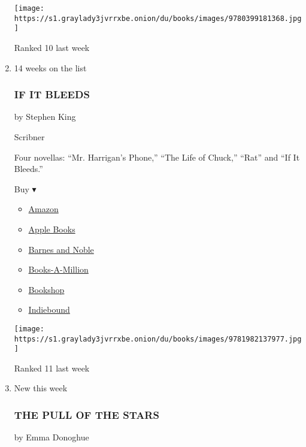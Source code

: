 \begin{enumerate}
  \texttt{[image: https://s1.graylady3jvrrxbe.onion/du/books/images/9780399181368.jpg]}

  Ranked 10 last week
\item
  14 weeks on the list

  \hypertarget{if-it-bleeds}{%
  \subsubsection{IF IT BLEEDS}\label{if-it-bleeds}}

  by Stephen King

  Scribner

  Four novellas: ``Mr. Harrigan's Phone,'' ``The Life of Chuck,''
  ``Rat'' and ``If It Bleeds.''

  Buy ▾

  \begin{itemize}
  \tightlist
  \item
    \href{https://www.amazon.com/dp/1982137975?tag=NYTBSREV-20\&tag=NYTBS-20}{Amazon}
  \item
    \href{https://du-gae-books-dot-nyt-du-prd.appspot.com/buy?title=IF+IT+BLEEDS\&author=Stephen+King}{Apple
    Books}
  \item
    \href{https://www.anrdoezrs.net/click-7990613-11819508?url=https\%3A\%2F\%2Fwww.barnesandnoble.com\%2Fw\%2F\%3Fean\%3D9781982137977}{Barnes
    and Noble}
  \item
    \href{https://www.anrdoezrs.net/click-7990613-35140?url=https\%3A\%2F\%2Fwww.booksamillion.com\%2Fp\%2FIF\%2BIT\%2BBLEEDS\%2FStephen\%2BKing\%2F9781982137977}{Books-A-Million}
  \item
    \href{https://bookshop.org/a/3546/9781982137977}{Bookshop}
  \item
    \href{https://www.indiebound.org/book/9781982137977?aff=NYT}{Indiebound}
  \end{itemize}

  \texttt{[image: https://s1.graylady3jvrrxbe.onion/du/books/images/9781982137977.jpg]}

  Ranked 11 last week
\item
  New this week

  \hypertarget{the-pull-of-the-stars}{%
  \subsubsection{THE PULL OF THE STARS}\label{the-pull-of-the-stars}}

  by Emma Donoghue


\end{enumerate}
